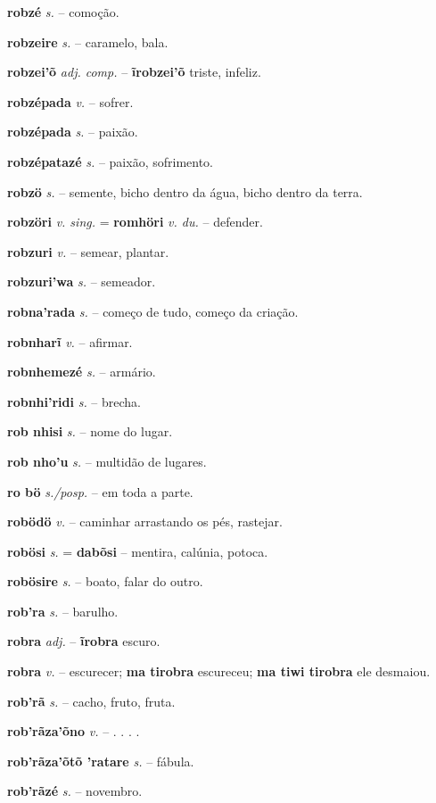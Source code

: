\textbf{robzé} \textit{s.} -- comoção.

\textbf{robzeire} \textit{s.} -- caramelo, bala.

\textbf{robzei'õ} \textit{adj. comp.} -- \textbf{ĩrobzei'õ} triste, infeliz.

\textbf{robzépada} \textit{v.} -- sofrer.

\textbf{robzépada} \textit{s.} -- paixão.

\textbf{robzépatazé} \textit{s.} -- paixão, sofrimento.

\textbf{robzö} \textit{s.} -- semente, bicho dentro da água, bicho dentro da terra.

\textbf{robzöri} \textit{v. sing.} = \textbf{romhöri} \textit{v. du.} -- defender.

\textbf{robzuri} \textit{v.} -- semear, plantar.

\textbf{robzuri'wa} \textit{s.} -- semeador.

\textbf{robna'rada} \textit{s.} -- começo de tudo, começo da criação.

\textbf{robnharĩ} \textit{v.} -- afirmar.

\textbf{robnhemezé} \textit{s.} -- armário.

\textbf{robnhi'ridi} \textit{s.} -- brecha.

\textbf{rob nhisi} \textit{s.} -- nome do lugar.

\textbf{rob nho'u} \textit{s.} -- multidão de lugares.

\textbf{ro bö} \textit{s./posp.} -- em toda a parte.

\textbf{robödö} \textit{v.} -- caminhar arrastando os pés, rastejar.

\textbf{robösi} \textit{s.} = \textbf{dabõsi} -- mentira, calúnia, potoca.

\textbf{robösire} \textit{s.} -- boato, falar do outro.

\textbf{rob'ra} \textit{s.} -- barulho.

\textbf{robra} \textit{adj.} -- \textbf{ĩrobra} escuro.

\textbf{robra} \textit{v.} -- escurecer; \textbf{ma tirobra} escureceu; \textbf{ma tiwi tirobra} ele desmaiou.

\textbf{rob'rã} \textit{s.} -- cacho, fruto, fruta.

\textbf{rob'rãza'õno} \textit{v.} -- . . . .

\textbf{rob'rãza'õtõ 'ratare} \textit{s.} -- fábula.

\textbf{rob'rãzé} \textit{s.} -- novembro.

